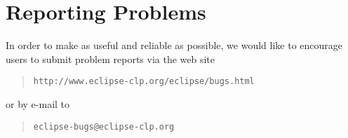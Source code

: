 \section{Reporting Problems}
In order to make {\eclipse} as useful and reliable as possible,
we would like to encourage users to submit problem reports via the web site
\begin{quote}
\begin{verbatim}
http://www.eclipse-clp.org/eclipse/bugs.html
\end{verbatim}
\end{quote}
or by e-mail to
\begin{quote}
\begin{verbatim}
eclipse-bugs@eclipse-clp.org
\end{verbatim}
\end{quote}
